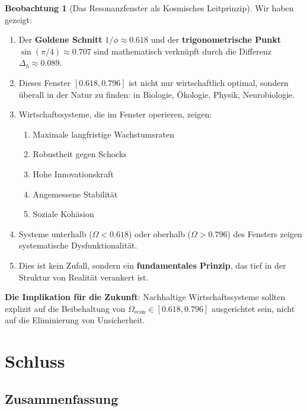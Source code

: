 \documentclass[a4paper,12pt,twoside]{report}
\theoremstyle{definition}
\newtheorem{beobachtung}{Beobachtung}
\begin{document}
\begin{beobachtung}[Das Resonanzfenster als Kosmisches Leitprinzip]

Wir haben gezeigt:

\begin{enumerate}
	\item Der \textbf{Goldene Schnitt} $1/\phi \approx 0.618$ und der \textbf{trigonometrische Punkt} $\sin(\pi/4) \approx 0.707$ sind mathematisch verknüpft durch die Differenz $\Delta_h \approx 0.089$.
	
	\item Dieses Fenster $[0.618, 0.796]$ ist nicht nur wirtschaftlich optimal, sondern überall in der Natur zu finden: in Biologie, Ökologie, Physik, Neurobiologie.
	
	\item Wirtschaftssysteme, die im Fenster operieren, zeigen:
	\begin{enumerate}
		\item Maximale langfristige Wachstumsraten
		\item Robustheit gegen Schocks
		\item Hohe Innovationskraft
		\item Angemessene Stabilität
		\item Soziale Kohäsion
	\end{enumerate}
	
	\item Systeme unterhalb ($\Omega < 0.618$) oder oberhalb ($\Omega > 0.796$) des Fensters zeigen systematische Dysfunktionalität.
	
	\item Dies ist kein Zufall, sondern ein \textbf{fundamentales Prinzip}, das tief in der Struktur von Realität verankert ist.
\end{enumerate}

\textbf{Die Implikation für die Zukunft}: Nachhaltige Wirtschaftssysteme sollten explizit auf die Beibehaltung von $\Omega_{\text{econ}} \in [0.618, 0.796]$ ausgerichtet sein, nicht auf die Eliminierung von Unsicherheit.

\end{beobachtung}

\section{Schluss}

\subsection{Zusammenfassung}
\end{document}
